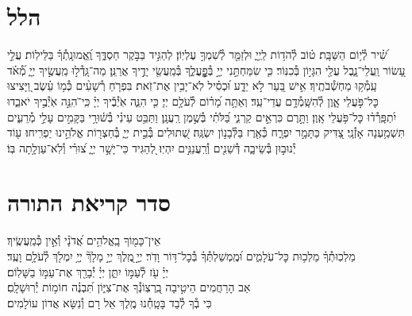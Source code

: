 \documentclass[twoside, openany, parskip=half, 11pt]{book}
\begin{document}
\label{hallel}
\section[הלל‎]{ הלל‎ }
\hallel{\shatz}


\vfill

\fullkaddish

\weekdayshir
\label{shirshabbat}

שִׁ֝֗יר לְ֯י֥וֹם הַשַּׁבָּֽת׃
ט֗וֹב לְ֯הֹד֥וֹת לַֽיְיָ֑ וּלְזַמֵּ֖ר לְ֯שִׁמְךָ֣ עֶלְיֽוֹן׃
לְהַגִּ֣יד בַּבֹּ֣קֶר חַסְדֶּ֑ךָ וֶֽ֝אֱמוּנָֽתְ֯ךָ֗ בַּלֵּילֽוֹת׃
עֲלֵ֣י עָ֭שׂוֹר וַֽעֲלֵי־נָ֑בֶל עֲלֵ֖י הִגָּי֣וֹן בְּ֯כִנּֽוֹר׃
כִּ֤י שִׂמַּחְתַּ֣נִי יְיָ֣ בְּ֯פׇׇׇׇׇׇׇֽעֳלֶ֑ךָ בְּ֯מַֽעֲשֵׂ֖י יָדֶ֣יךָ אֲרַנֵּֽן׃
מַה־גָּֽדְ֯ל֣וּ מַֽעֲשֶׂ֣יךָ יְיָ֑ מְ֝֯אֹ֗ד עָֽמְ֯ק֥וּ מַחְשְׁ֯בֹתֶֽיךָ׃
אִ֣ישׁ בַּ֭עַר לֹ֣א יֵדָ֑ע וּ֝כְסִ֗יל לֹֽא־יָבִ֥ין אֶת־זֹֽאת׃
בִּפְרֹ֤חַ רְ֯שָׁעִ֨ים כְּ֯מ֥וֹ עֵ֗שֶׂב וַ֭יָּצִיצוּ כׇּל־פֹּ֣עֲלֵי אָ֑וֶן לְ֯הִשָּֽׁמְ֯דָ֥ם עֲדֵי־עַֽד׃
וְאַתָּ֥ה מָ֝ר֗וֹם לְ֯עֹלָ֥ם יְיָ׃
כִּ֤י הִנֵּ֢ה אֹֽיְ֯בֶ֡יךָ יְיָ֗ כִּֽי־ֹהִנֵּ֣ה אֹֽיְ֯בֶ֣יךָ יֹאבֵ֑דוּ יִ֝תְפָּֽרְ֯ד֗וּ כׇּל־פֹּ֥עֲלֵי אָֽוֶן׃
וַתָּ֣רֶם כִּרְאֵ֣ים קַרְנִ֑י בַּ֝לֹּתִ֗י בְּ֯שֶׁ֣מֶן רַֽעֲנָֽן׃
וַתַּבֵּ֥ט עֵינִ֗י בְּ֯שׁ֫וּרָ֥י בַּקָּמִ֣ים עָלַ֣י מְ֯רֵעִ֑ים תִּשְׁמַ֥עְנָה אָזְ֯נָֽי׃
צַ֭דִּיק כַּתָּמָ֣ר יִפְרָ֑ח כְּ֯אֶ֖רֶז בַּלְּ֯בָנ֣וֹן יִשְׂגֶּֽה׃
שְׁ֭תוּלִים בְּ֯בֵ֣ית יְיָ֑ בְּ֯חַצְר֖וֹת אֱלֹהֵ֣ינוּ יַפְרִֽיחוּ׃
ע֖וֹד יְ֯נוּב֣וּן בְּ֯שֵׂיבָ֑ה דְּ֯שֵׁנִ֖ים וְ֯רַֽעֲנַנִּ֣ים יִהְיֽוּ׃
לְ֭הַגִּיד כִּי־יָשָׁ֣ר יְיָ֑ צ֝וּרִ֗י וְ֯לֹֽא־עַוְלָ֥תָה בּֽוֹ׃
\mournerskaddish



\nextpage

\section[סדר קריאת התורה]{ סדר קריאת התורה }

אֵין־כָּמ֖וֹךָ בָֽאֱלֹהִ֥ים אֲ֝דֹנָ֗י וְ֯אֵ֣ין כְּ֯מַֽעֲשֶֽׂיךָ׃
\\
מַלְכֽוּתְ֯ךָ֗ מַלְכ֥וּת כׇּל־עֹֽלָמִ֑ים וּ֝מֶֽמְשַׁלְתְּ֯ךָ֗ בְּ֯כׇל־דּ֥וֹר וָדֹֽר׃
יְיָ֣ ֖מֶֽלֶךְ
יְיָ֣ מָלָךְ֘
יְיָ֥ יִמְלֹ֖ךְ לְ֯עֹלָ֥ם וָעֶֽד׃
\\
יְיָ֗ עֹ֖ז לְ֯עַמּ֣וֹ יִתֵּ֑ן יְיָ֓ יְ֯בָרֵ֖ךְ אֶת־עַמּ֣וֹ בַשָּׁלֽוֹם׃
\\
אַב הָרַחֲמִים הֵיטִ֣יבָה בִֽ֭רְצֽוֹנְ֯ךָ אֶת־צִיּ֑וֹן תִּ֝בְנֶ֗ה חוֹמ֥וֹת יְ֯רֽוּשָׁלָֽםִ׃
\\
כִּי בְ֯ךָ לְ֯בַד בָּטָֽחְ֯נוּ מֶֽלֶךְ אֵל רָם וְ֯נִשָּׂא אֲדוֹן עוֹלָמִים׃
\end{document}
